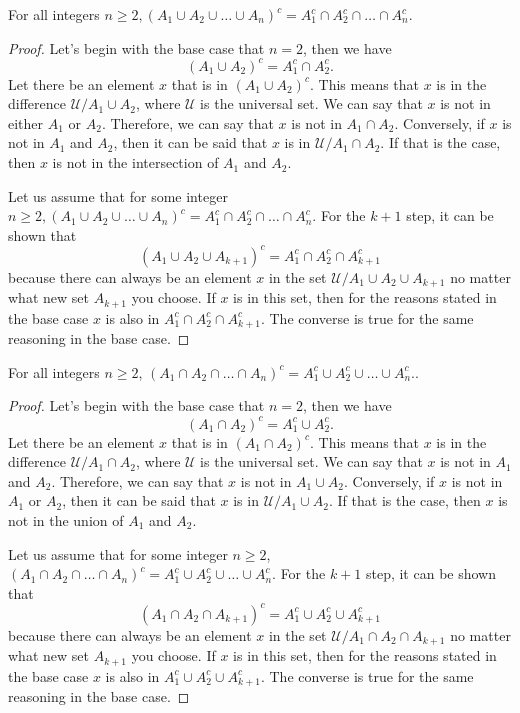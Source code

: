 \begin{proposition}
    For all integers $n \geq 2, (A_1 \cup A_2 \cup \dots \cup A_n)^c = A_1^c \cap A_2^c \cap \dots \cap A_n^c.$
\end{proposition}

\begin{proof}
    Let's begin with the base case that $n=2$, then we have
    $$(A_1 \cup A_2)^c = A^c_1 \cap A^c_2.$$
    Let there be an element $x$ that is in $(A_1 \cup A_2)^c.$  This means that  $x$ is in the difference $\mathcal{U} / A_1 \cup A_2$, where $\mathcal{U}$ is the universal set. We can say that $x$ is not in either $A_1$ or $A_2$. Therefore, we can say that $x$ is not in $A_1 \cap A_2$. Conversely, if $x$ is not in $A_1$ and $A_2$, then it can be said that $x$ is in $\mathcal{U}/A_1 \cap A_2.$ If that is the case, then $x$ is not in the intersection of $A_1$ and $A_2.$

    Let us assume that for some integer $n \geq 2, (A_1 \cup A_2 \cup \dots \cup A_n)^c = A_1^c \cap A_2^c \cap \dots \cap A_n^c.$ For the $k+1$ step, it can be shown that
    $$(A_1 \cup A_2 \cup A_{k+1})^c = A_1^c \cap A_2^c \cap A_{k+1}^c $$
    because there can always be an element $x$ in the set $\mathcal{U} / A_1 \cup A_2 \cup A_{k+1} $ no matter what new set $A_{k+1}$ you choose. If $x$ is in this set, then for the reasons stated in the base case $x$ is also in $A_1^c \cap A_2^c \cap A_{k+1}^c.$ The converse is true for the same reasoning in the base case.
\end{proof}

\begin{proposition}
    For all integers $n \geq 2$, $(A_1 \cap A_2 \cap \dots \cap A_n)^c = A_1^c \cup A_2^c \cup \dots \cup A_n^c.$.
\end{proposition}

\begin{proof}
    Let's begin with the base case that $n=2$, then we have
    $$(A_1 \cap A_2)^c = A^c_1 \cup A^c_2.$$
    Let there be an element $x$ that is in $(A_1 \cap A_2)^c.$  This means that  $x$ is in the difference $\mathcal{U} / A_1 \cap A_2$, where $\mathcal{U}$ is the universal set. We can say that $x$ is not in $A_1$ and $A_2$. Therefore, we can say that $x$ is not in $A_1 \cup A_2$. Conversely, if $x$ is not in $A_1$ or $A_2$, then it can be said that $x$ is in $\mathcal{U}/A_1 \cup A_2.$ If that is the case, then $x$ is not in the union of $A_1$ and $A_2.$

    Let us assume that for some integer $n \geq 2$, $(A_1 \cap A_2 \cap \dots \cap A_n)^c = A_1^c \cup A_2^c \cup \dots \cup A_n^c.$ For the $k+1$ step, it can be shown that
    $$(A_1 \cap A_2 \cap A_{k+1})^c = A_1^c \cup A_2^c \cup A_{k+1}^c $$
    because there can always be an element $x$ in the set $\mathcal{U} / A_1 \cap A_2 \cap A_{k+1} $ no matter what new set $A_{k+1}$ you choose. If $x$ is in this set, then for the reasons stated in the base case $x$ is also in $A_1^c \cup A_2^c \cup A_{k+1}^c.$ The converse is true for the same reasoning in the base case.
\end{proof}
